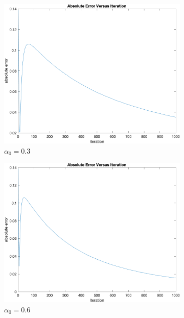 \documentclass{article}
\begin{document}
\begin{figure}[htp]
	
	\begin{subfigure}{.5\textwidth}
		\centering
		\includegraphics[width=0.9\linewidth]{figs/Q3/Iteration/M1000_a03.png}
		\caption{$ \alpha_0 = 0.3 $}
	\end{subfigure}
	\begin{subfigure}{.5\textwidth}
		\centering
		\includegraphics[width=0.9\linewidth]{figs/Q3/Iteration/M1000_a06.png}
		\caption{$ \alpha_0 = 0.6 $}
	\end{subfigure}
	\begin{subfigure}{.5\textwidth}
		\centering

\end{subfigure}
\end{figure}
\end{document}
